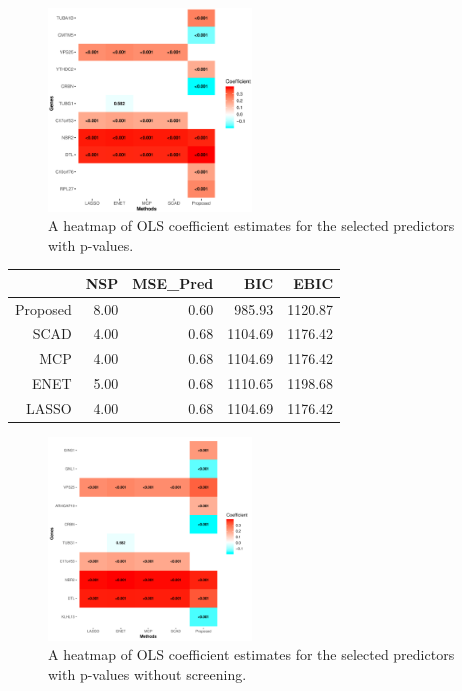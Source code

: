 \begin{figure}
\centering
\includegraphics[width=0.48\textwidth]{heatmap.eps}
\caption{A heatmap of OLS coefficient estimates for the selected predictors with p-values.\label{Fig:heatmap}}
\end{figure}

\begin{table}[ht]
	\centering
	\begin{tabular}{rrrrr}
		\hline
		& NSP & MSE\_Pred & BIC & EBIC \\ 
		\hline
		Proposed & 8.00 & 0.60 & 985.93 & 1120.87 \\ 
		SCAD & 4.00 & 0.68 & 1104.69 & 1176.42 \\ 
		MCP & 4.00 & 0.68 & 1104.69 & 1176.42 \\ 
		ENET & 5.00 & 0.68 & 1110.65 & 1198.68 \\ 
		LASSO & 4.00 & 0.68 & 1104.69 & 1176.42 \\ 
		\hline
	\end{tabular}
\end{table}

\begin{figure}
	\centering
	\includegraphics[width=0.48\textwidth]{heatmap1.pdf}
	\caption{A heatmap of OLS coefficient estimates for the selected predictors with p-values without screening.\label{Fig:heatmap1}}
\end{figure}

